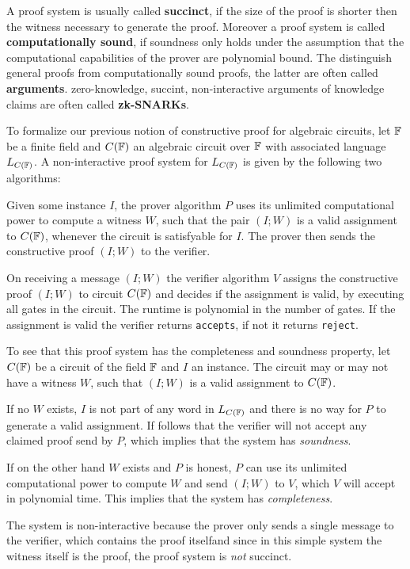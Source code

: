 A proof system is usually called \textbf{succinct}, if the size of the proof is shorter then the witness necessary to generate the proof. Moreover a proof system is called \textbf{computationally sound}, if soundness only holds under the assumption that the computational capabilities of the prover are polynomial bound. The distinguish general proofs from computationally sound proofs, the latter are often called \textbf{arguments}. zero-knowledge, succint, non-interactive arguments of knowledge claims are often called \textbf{zk-SNARKs}.
\begin{example} To formalize our previous notion of constructive proof for algebraic circuits, let $\mathbb{F}$ be a finite field and $C(\mathbb{F})$ an algebraic circuit over $\mathbb{F}$ with associated language $L_{C(\mathbb{F})}$. A non-interactive proof system for $L_{C(\mathbb{F})}$ is given by the following two algorithms:

Given some instance $I$, the prover algorithm $P$ uses its unlimited computational power to compute a witness $W$, such that the pair $(I;W)$ is a valid assignment to $C(\mathbb{F})$, whenever the circuit is satisfyable for $I$. The prover then sends the constructive proof $(I;W)$ to the verifier.

On receiving a message $(I;W)$ the verifier algorithm $V$ assigns the constructive proof $(I;W)$ to circuit $C(\mathbb{F})$ and decides if the assignment is valid, by executing all gates in the circuit. The runtime is polynomial in the number of gates. If the assignment is valid the verifier returns \texttt{accepts}, if not it returns \texttt{reject}. 

To see that this proof system has the completeness and soundness property, let $C(\mathbb{F})$ be a circuit of the field $\mathbb{F}$ and $I$ an instance. The circuit may or may not have a witness $W$, such that $(I;W)$ is a valid assignment to $C(\mathbb{F})$. 

If no $W$ exists, $I$ is not part of any word in $L_{C(\mathbb{F})}$ and there is no way for $P$ to generate a valid assignment. If follows that the verifier will not accept any claimed proof send by $P$, which implies that the system has \textit{soundness}.

If on the other hand $W$ exists and $P$ is honest, $P$ can use its unlimited computational power to compute $W$ and send $(I;W)$ to $V$, which $V$ will accept in polynomial time. This implies that the system has \textit{completeness}.

The system is non-interactive because the prover only sends a single message to the verifier, which contains the proof itselfand since in this simple system the witness itself is the proof, the proof system is \textit{not} succinct.
\end{example}
